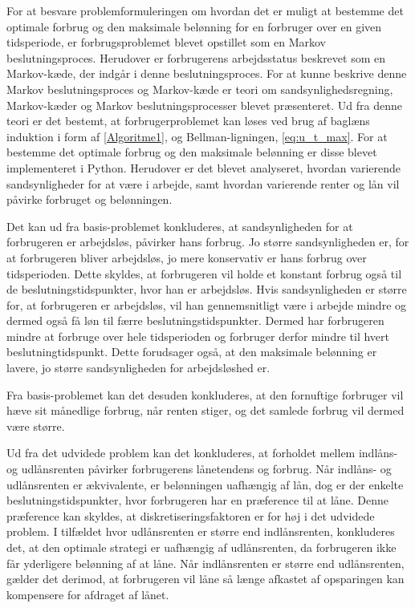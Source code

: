 For at besvare problemformuleringen om hvordan det er muligt at bestemme det optimale forbrug og den maksimale belønning for en forbruger over en given tidsperiode, er forbrugsproblemet blevet opstillet som en Markov beslutningsproces. Herudover er forbrugerens arbejdsstatus beskrevet som en Markov-kæde, der indgår i denne beslutningsproces. For at kunne beskrive denne Markov beslutningsproces og Markov-kæde er teori om sandsynlighedsregning, Markov-kæder og Markov beslutningsprocesser blevet præsenteret. Ud fra denne teori er det bestemt, at forbrugerproblemet kan løses ved brug af baglæns induktion i form af \autoref{Algoritme1}, og Bellman-ligningen, \autoref{eq:u_t_max}. For at bestemme det optimale forbrug og den maksimale belønning er disse blevet implementeret i Python. Herudover er det blevet analyseret, hvordan varierende sandsynligheder for at være i arbejde, samt hvordan varierende renter og lån vil påvirke forbruget og belønningen. 

Det kan ud fra basis-problemet konkluderes, at sandsynligheden for at forbrugeren er arbejdsløs, påvirker hans forbrug. Jo større sandsynligheden er, for at forbrugeren bliver arbejdsløs, jo mere konservativ er hans forbrug over tidsperioden. Dette skyldes, at forbrugeren vil holde et konstant forbrug også til de beslutningstidspunkter, hvor han er arbejdsløs. Hvis sandsynligheden er større for, at forbrugeren er arbejdsløs, vil han gennemsnitligt være i arbejde mindre og dermed også få løn til færre beslutningstidspunkter. Dermed har forbrugeren mindre at forbruge over hele tidsperioden og forbruger derfor mindre til hvert beslutningtidspunkt. Dette forudsager også, at den maksimale belønning er lavere, jo større sandsynligheden for arbejdsløshed er.

Fra basis-problemet kan det desuden konkluderes, at den fornuftige forbruger vil hæve sit månedlige forbrug, når renten stiger, og det samlede forbrug vil dermed være større.

Ud fra det udvidede problem kan det konkluderes, at forholdet mellem indlåns- og udlånsrenten påvirker forbrugerens lånetendens og forbrug. Når indlåns- og udlånsrenten er ækvivalente, er belønningen uafhængig af lån, dog er der enkelte beslutningstidspunkter, hvor forbrugeren har en præference til at låne. Denne præference kan skyldes, at diskretiseringsfaktoren er for høj i det udvidede problem. I tilfældet hvor udlånsrenten er større end indlånsrenten, konkluderes det, at den optimale strategi er uafhængig af udlånsrenten, da forbrugeren ikke får yderligere belønning af at låne. Når indlånsrenten er større end udlånsrenten, gælder det derimod, at forbrugeren vil låne så længe afkastet af opsparingen kan kompensere for afdraget af lånet. 


